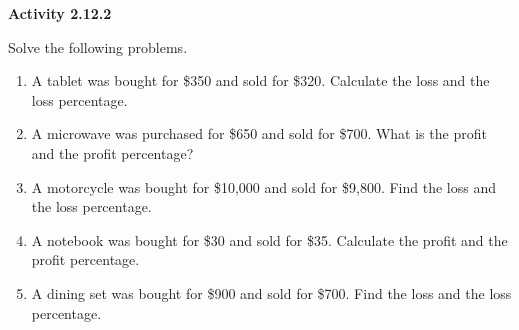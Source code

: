  \vspace{0.2ex}
\noindent\textbf{Activity 2.12.2}

\vspace{0.2ex}


Solve the following problems.

\begin{enumerate}[noitemsep, label = \color{blue}\arabic*. ]    
    \item A tablet was bought for \$350 and sold for \$320. Calculate the loss and the loss percentage.
    \item A microwave was purchased for \$650 and sold for \$700. What is the profit and the profit percentage?
    \item A motorcycle was bought for \$10,000 and sold for \$9,800. Find the loss and the loss percentage.
    \item A notebook was bought for \$30 and sold for \$35. Calculate the profit and the profit percentage.
    \item A dining set was bought for \$900 and sold for \$700. Find the loss and the loss percentage.
\end{enumerate}


